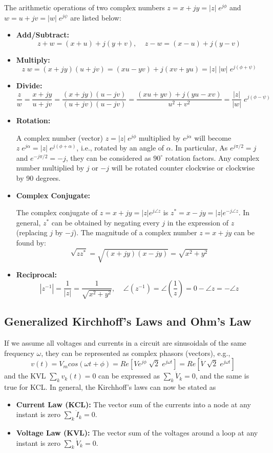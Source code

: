 The arithmetic operations of two complex numbers $z=x+jy=|z|\;e^{j\phi}$ 
and $w=u+jv=|w|\;e^{j\psi}$ are listed below:
\begin{itemize}
	\item {\bf Add/Subtract:} 
\[	z+w=(x+u)+j(y+v),\;\;\;\;z-w=(x-u)+j(y-v)	\]
	\item {\bf Multiply:}
\[	z\;w=(x+jy)(u+jv)=(xu-yv)+j(xv+yu)=|z|\;|w|\;e^{j(\phi+\psi)}	\]
	\item {\bf Divide:}
\[	\frac{z}{w}=\frac{x+jy}{u+jv}=\frac{(x+jy)(u-jv)}{(u+jv)(u-jv)}
	=\frac{(xu+yv)+j(yu-xv)}{u^2+v^2}
	=\frac{|z|}{|w|}\;e^{j(\phi-\psi)}	\]
	\item {\bf Rotation:}

A complex number (vector) $z=|z|\;e^{j\phi}$ multiplied by $e^{j\alpha}$ 
will become $z\;e^{j\alpha}=|z|\;e^{j(\phi+\alpha)}$, i.e., rotated by
an angle of $\alpha$. In particular, As $e^{j\pi/2}=j$ and $e^{-j\pi/2}=-j$,
they can be considered as $90^\circ$ rotation factors. Any complex number
multiplied by $j$ or $-j$ will be rotated counter clockwise or clockwise 
by 90 degrees.

	\item {\bf Complex Conjugate:}

The complex conjugate of $z=x+jy=|z|e^{j\angle z}$ is 
$z^*=x-jy=|z|e^{-j\angle z} $. In general, $z^*$ can be obtained by
negating every $j$ in the expression of $z$ (replacing $j$ by $-j$). 
The magnitude of a complex number $z=x+jy$ can be found by:
\[	\sqrt{zz^*}=\sqrt{(x+jy)(x-jy)}=\sqrt{x^2+y^2}	\]

	\item {\bf Reciprocal:}
\[	|z^{-1}|=\frac{1}{|z|}=\frac{1}{\sqrt{x^2+y^2}},\;\;\;\;
	\angle(z^{-1})=\angle(\frac{1}{z})=0-\angle{z}=-\angle z	\]

\end{itemize}

\subsection*{Generalized Kirchhoff's Laws and Ohm's Law}

If we assume all voltages and currents in a circuit are sinusoidals of
the same frequency $\omega$, they can be represented as complex phasors 
(vectors), e.g.,
\[
v(t)=V_m cos(\omega t+\phi)=Re[V e^{j\phi}\;\sqrt{2}\;e^{j\omega t}]
=Re[\dot{V}\;\sqrt{2}\;e^{j\omega t}]	\]
and the KVL $\sum_k v_k(t)=0$ can be expressed as $\sum_k \dot{V}_k=0$,
and the same is true for KCL. In general, the Kirchhoff's laws can now 
be stated as
\begin{itemize}
\item {\bf Current Law (KCL):} The vector sum of the currents into a node
	at any instant is zero	$\sum_k \dot{I}_k=0$.
\item {\bf Voltage Law (KVL):} The vector sum of the voltages around a
	loop at any instant is zero $\sum_k \dot{V}_k=0$.
\end{itemize}

